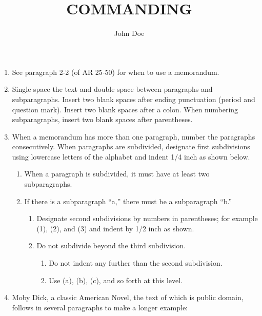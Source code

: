 \documentclass{../armymemo}
\author{John Doe}\rank{CPT}\branch{CY}\title{COMMANDING}
\begin{document}
\begin{enumerate}
	\item See paragraph 2-2 (of AR 25-50) for when to use a memorandum.
	\item Single space the text and double space between paragraphs and subparagraphs. Insert two blank spaces after ending punctuation (period and question mark). Insert two blank spaces after a colon. When numbering subparagraphs, insert two blank spaces after parentheses.
	\item When a memorandum has more than one paragraph, number the paragraphs consecutively. When paragraphs are subdivided, designate first subdivisions using lowercase letters of the alphabet and indent 1/4 inch as shown below.
	      \begin{enumerate}
		      \item When a paragraph is subdivided, it must have at least two subparagraphs.
		      \item If there is a subparagraph ``a,'' there must be a subparagraph ``b.''
		            \begin{enumerate}
			            \item Designate second subdivisions by numbers in parentheses; for example (1), (2), and (3) and indent by 1/2 inch as shown.
			            \item Do not subdivide beyond the third subdivision.
			                  \begin{enumerate}
				                  \item Do not indent any further than the second subdivision.
				                  \item Use (a), (b), (c), and so forth at this level.
			                  \end{enumerate}
		            \end{enumerate}
	      \end{enumerate}
	\item Moby Dick, a classic American Novel, the text of which is public domain,
	      follows in several paragraphs to make a longer example:


\end{enumerate}
\end{document}
